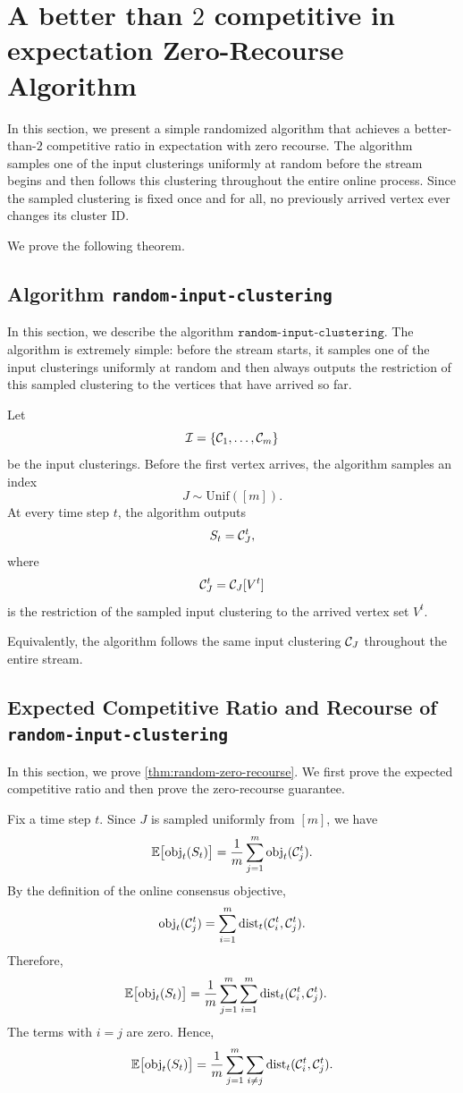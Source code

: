 \section{A better than $2$ competitive in expectation Zero-Recourse Algorithm}

In this section, we present a simple randomized algorithm that achieves a better-than-\(2\) competitive ratio in expectation with zero recourse. The algorithm samples one of the input clusterings uniformly at random before the stream begins and then follows this clustering throughout the entire online process. Since the sampled clustering is fixed once and for all, no previously arrived vertex ever changes its cluster ID.

We prove the following theorem.

\zerorecoupper*

\subsection{Algorithm \texttt{random-input-clustering}}

In this section, we describe the algorithm \(\texttt{random-input-clustering}\). The algorithm is extremely simple: before the stream starts, it samples one of the input clusterings uniformly at random and then always outputs the restriction of this sampled clustering to the vertices that have arrived so far.

Let
\[
    \mathcal{I}=\{\mathcal{C}_1,\ldots,\mathcal{C}_m\}
\]
be the input clusterings. Before the first vertex arrives, the algorithm samples an index
\[
    J\sim \mathrm{Unif}([m]).
\]
At every time step \(t\), the algorithm outputs
\[
    S_t=\mathcal{C}_J^t,
\]
where
\[
    \mathcal{C}_J^t=\mathcal{C}_J[V^t]
\]
is the restriction of the sampled input clustering to the arrived vertex set \(V^t\).

Equivalently, the algorithm follows the same input clustering \(\mathcal{C}_J\) throughout the entire stream.

\subsection{Expected Competitive Ratio and Recourse of \texttt{random-input-clustering}}

In this section, we prove \cref{thm:random-zero-recourse}. We first prove the expected competitive ratio and then prove the zero-recourse guarantee.

Fix a time step \(t\). Since \(J\) is sampled uniformly from \([m]\), we have
\[
    \mathbb{E}\bigl[\text{obj}_t(S_t)\bigr]
    =
    \frac1m
    \sum_{j=1}^m
    \text{obj}_t(\mathcal{C}_j^t).
\]
By the definition of the online consensus objective,
\[
    \text{obj}_t(\mathcal{C}_j^t)
    =
    \sum_{i=1}^m
    \text{dist}_t(\mathcal{C}_i^t,\mathcal{C}_j^t).
\]
Therefore,
\[
\begin{aligned}
    \mathbb{E}\bigl[\text{obj}_t(S_t)\bigr]
    &=
    \frac1m
    \sum_{j=1}^m
    \sum_{i=1}^m
    \text{dist}_t(\mathcal{C}_i^t,\mathcal{C}_j^t).
\end{aligned}
\]
The terms with \(i=j\) are zero. Hence,
\[
    \mathbb{E}\bigl[\text{obj}_t(S_t)\bigr]
    =
    \frac1m
    \sum_{j=1}^m
    \sum_{i\neq j}
    \text{dist}_t(\mathcal{C}_i^t,\mathcal{C}_j^t).
\]

